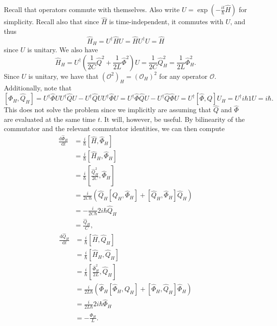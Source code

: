 \documentclass[11pt, letterpaper]{article}
\begin{document}
Recall that operators commute with themselves. Also write $U=\exp \left( -\frac{it}{\hbar } \hat{H}  \right) $ for simplicity.  Recall also that since $\hat{H} $ is time-independent, it commutes with $U$, and thus
\[
	\hat{H} _H=U^\dagger \hat{H} U=\hat{H} U^\dagger U = \hat{H} 
\]
since $U$ is unitary. We also have
\[
	\hat{H} _H = U^\dagger \left( \frac{1}{2C} \hat{Q} ^2+\frac{1}{2L} \hat{\Phi }^2 \right) U = \frac{1}{2C} \hat{Q} _H^2 = \frac{1}{2L} \hat{\Phi }^2_H
.\]
Since $U$ is unitary, we have that $(\mathcal{O} ^2)_H=(\mathcal{O} _H)^2$ for any operator $\mathcal{O} $. Additionally, note that
\[
	\left[ \hat{\Phi }_H,\hat{Q}_H  \right] =U^\dagger \hat{\Phi } UU^\dagger \hat{Q} U-U^\dagger \hat{Q} UU^\dagger \hat{\Phi } U = U^\dagger \hat{\Phi } \hat{Q} U-U^\dagger \hat{Q} \hat{\Phi }U=U^\dagger[\hat{\Phi },Q]U_H=U^\dagger i\hbar 1 U =i\hbar 
.\]
This does not solve the problem since we implicitly are assuming that $\hat{Q} $ and $\hat{\Phi }$ are evaluated at the same time $t$. It will, however, be useful. By bilinearity of the commutator and the relevant commutator identities, we can then compute
\begin{align*}
	\frac{\mathrm{d}\hat{\Phi }_H}{\mathrm{d}t} &=\frac{i}{\hbar } \left[ \hat{H} ,\hat{\Phi }_H \right] \\
						    &=\frac{i}{\hbar } \left[ \hat{H} _H, \hat{\Phi }_H \right] \\
						    &=\frac{i}{\hbar } \left[ \frac{\hat{Q} ^2_H}{2C} ,\hat{\Phi }_H \right] \\
						    &=\frac{i}{2C \hbar } \left( \hat{Q}_H[\hat{Q} _H,\hat{\Phi }_H] + [\hat{Q} _H,\hat{\Phi }_H]\hat{Q} _H \right) \\
						    &=-\frac{i}{2C \hbar } 2i\hbar \hat{Q} _H\\
						    &=\frac{\hat{Q} _H}{C} 
,\end{align*}
\begin{align*}
	\frac{\mathrm{d}\hat{Q} _H}{\mathrm{d}t} &=\frac{i}{\hbar } \left[ \hat{H} ,\hat{Q} _H \right] \\
						 &=\frac{i}{\hbar } \left[ \hat{H} _H,\hat{Q} _H \right] \\
						 &=\frac{i}{\hbar } \left[ \frac{\hat{\Phi }^2_H}{2L} ,\hat{Q} _H \right] \\
						 &=\frac{i}{2L\hbar } \left( \hat{\Phi }_H\left[ \hat{\Phi }_H,Q_H \right] +\left[ \hat{\Phi }_H,\hat{Q} _H \right] \hat{\Phi }_H \right) \\
						 &=\frac{i}{2L\hbar } 2i\hbar \hat{\Phi }_H\\
						 &=-\frac{\hat{\Phi }_H}{L} 
.\end{align*}
\end{document}
